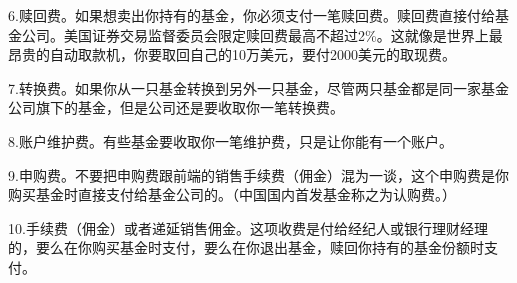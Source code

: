 6.赎回费。如果想卖出你持有的基金，你必须支付一笔赎回费。赎回费直接付给基金公司。美国证券交易监督委员会限定赎回费最高不超过2\%。这就像是世界上最昂贵的自动取款机，你要取回自己的10万美元，要付2000美元的取现费。

7.转换费。如果你从一只基金转换到另外一只基金，尽管两只基金都是同一家基金公司旗下的基金，但是公司还是要收取你一笔转换费。

8.账户维护费。有些基金要收取你一笔维护费，只是让你能有一个账户。

9.申购费。不要把申购费跟前端的销售手续费（佣金）混为一谈，这个申购费是你购买基金时直接支付给基金公司的。（中国国内首发基金称之为认购费。）

10.手续费（佣金）或者递延销售佣金。这项收费是付给经纪人或银行理财经理的，要么在你购买基金时支付，要么在你退出基金，赎回你持有的基金份额时支付。
